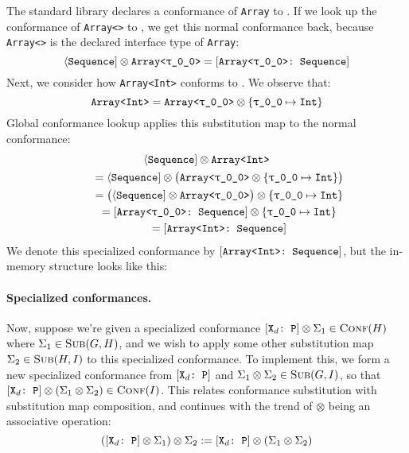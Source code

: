 \documentclass[../generics]{subfiles}
\begin{document}
\begin{example}\label{specialized conf example}
The standard library declares a conformance of \texttt{Array} to \tSequence.
If we look up the conformance of \texttt{Array<\rT>} to \tSequence, we get this normal conformance back, because \texttt{Array<\rT>} is the declared interface type of \texttt{Array}:
\[ \PSequence\otimes\texttt{Array<\rT>} = \ArraySequence \]
Next, we consider how \texttt{Array<Int>} conforms to \tSequence. We observe that:
\[\texttt{Array<Int>} = \texttt{Array<\rT>} \otimes \SubMapInt\]
Global conformance lookup applies this substitution map to the normal conformance:
\begin{gather*}
\PSequence\otimes\texttt{Array<Int>}\\
\qquad {} = \PSequence\otimes\bigl(\texttt{Array<\rT>}\otimes\SubMapInt\bigr)\\
\qquad {} = \bigl(\PSequence\otimes\texttt{Array<\rT>}\bigr)\otimes\SubMapInt\\
\qquad {} = \ArraySequence\otimes\SubMapInt\\
\qquad {} = \ArrayIntSequence
\end{gather*}
We denote this specialized conformance by $[\texttt{Array<Int>:~Sequence}]$, but the in-memory structure looks like this:

\begin{center}
\end{center}
\end{example}

\paragraph{Specialized conformances.}
Now, suppose we're given a specialized conformance $[\texttt{$\texttt{X}_d$:~P}]\otimes\Sigma_1\in\textsc{Conf}({H})$ where $\Sigma_1\in\textsc{Sub}({G, H})$, and we wish to apply some other substitution map $\Sigma_2\in\textsc{Sub}({H, I})$ to this specialized conformance. To implement this, we form a new specialized conformance from $[\texttt{$\texttt{X}_d$:~P}]$ and $\Sigma_1 \otimes \Sigma_2 \in \textsc{Sub}({G, I})$, so that $[\texttt{$\texttt{X}_d$:~P}] \otimes (\Sigma_1\otimes\Sigma_2) \in \textsc{Conf}({I})$. This relates conformance substitution with substitution map composition, and continues with the trend of $\otimes$ being an associative operation:
\[([\texttt{$\texttt{X}_d$:~P}]\otimes\Sigma_1)\otimes\Sigma_2 := [\texttt{$\texttt{X}_d$:~P}]\otimes(\Sigma_1\otimes\Sigma_2)\]
\end{document}
